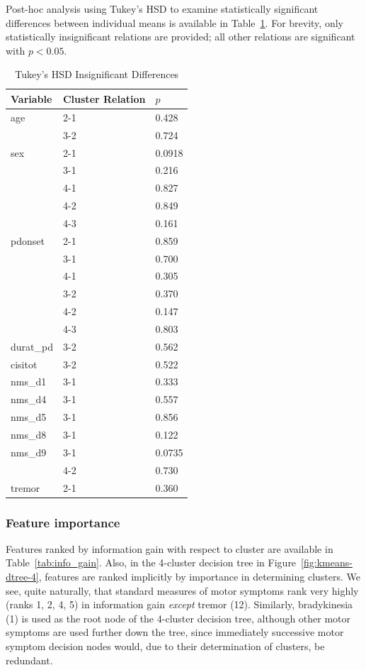 \documentclass[10pt]{article}
\begin{document}
\begin{multicols}{2}
Post-hoc analysis using Tukey's HSD to examine statistically significant
differences between individual means is available in Table~\ref{tab:tukeyhsd}.
For brevity, only statistically insignificant relations are provided; all other
relations are significant with $p < 0.05$.

\begin{table}[H]
  \centering
  \begin{tabular}{l|l|l}
  Variable & Cluster Relation & $p$ \\
  \hline
age & 2-1 & 0.428 \\
    & 3-2 & 0.724 \\
    \hline
sex & 2-1 & 0.0918 \\
    & 3-1 & 0.216 \\
    & 4-1 & 0.827 \\
    & 4-2 & 0.849 \\
    & 4-3 & 0.161 \\
    \hline
pdonset & 2-1 & 0.859 \\
        & 3-1 & 0.700 \\
        & 4-1 & 0.305 \\
        & 3-2 & 0.370 \\
        & 4-2 & 0.147 \\
        & 4-3 & 0.803 \\
\hline
durat\_pd & 3-2 & 0.562 \\
\hline
cisitot & 3-2 & 0.522 \\
\hline
nms\_d1 & 3-1 & 0.333 \\
\hline
nms\_d4 & 3-1 & 0.557 \\
\hline
nms\_d5 & 3-1 & 0.856 \\
\hline
nms\_d8 & 3-1 & 0.122 \\
\hline
nms\_d9 & 3-1 & 0.0735 \\
       & 4-2 & 0.730 \\
\hline
tremor & 2-1 & 0.360 \\
  \end{tabular}
  \caption{Tukey's HSD Insignificant Differences}
  \label{tab:tukeyhsd}
\end{table}

\subsubsection{Feature importance}
\label{feature-importance}

Features ranked by information gain with respect to cluster are available in
Table~\ref{tab:info_gain}. Also, in the 4-cluster decision tree in
Figure~\ref{fig:kmeans-dtree-4}, features are ranked implicitly by importance
in determining clusters. We see, quite naturally, that standard measures of
motor symptoms rank very highly (ranks 1, 2, 4, 5) in information gain \emph{except}
tremor (12). Similarly, bradykinesia (1) is used as the root node of the
4-cluster decision tree, although other motor symptoms are used further down
the tree, since immediately successive motor symptom decision nodes would, due
to their determination of clusters, be redundant.


\end{multicols}
\end{document}
